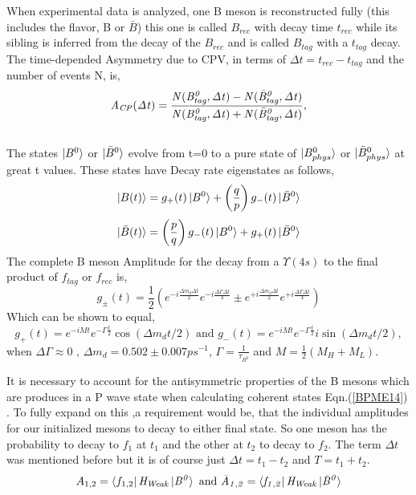 When experimental data is analyzed, one B meson is reconstructed fully (this includes the flavor, B or $\bar{B}$) this one is called $B_{rec}$ with decay time $t_{rec}$ while its sibling is inferred from the decay of the $B_{rec}$ and is called $B_{tag}$ with a $t_{tag}$ decay. The time-depended Asymmetry due to CPV, in terms of $\Delta{t} = t_{rec}-t_{tag}$ and the number of events N, is,
\begin{equation}\label{BPME6}
\it{A}_{CP}(\Delta t)= \frac{N(B^{0}_{tag},\Delta t)-N(\bar{B}^{0}_{tag},\Delta t)}{N(B^{0}_{tag},\Delta t)+N(\bar{B}^{0}_{tag},\Delta t)},
\end{equation}
\\

The states $\ket{B^{0}}$ or $\ket{\bar{B}^{0}}$ evolve from t=0 to a pure state of $\ket{B_{phys}^{0}}$ or $\ket{\bar{B}^{0}_{phys}}$ at great t values. 
These states have Decay rate eigenstates as follows,
\begin{equation}\label{BPME7}
\ket{B(t)}= g_+(t)\ket{B^0}+\left(\frac{q}{p}\right)g_{-}(t)\ket{\bar{B}^0}
\end{equation}
\begin{equation}\label{BPME8}
\ket{\bar{B}(t)}= \left(\frac{p}{q}\right)g_-(t)\ket{B^0}+g_{+}(t)\ket{\bar{B}^0}
\end{equation}
The complete B meson Amplitude for the decay from a $\Upsilon(4s)$ to the final product of $f_{tag}$ or $f_{rec}$ is,
\begin{equation}\label{BPME10}
 g_{\pm}(t)=\frac{1}{2}(e^{-i\frac{\Delta m_d \Delta t}{2}}e^{-i\frac{\Delta\Gamma \Delta t}{4}}\pm e^{+i\frac{\Delta m_d \Delta t}{2}}e^{+i\frac{\Delta\Gamma \Delta t}{4}})
\end{equation}
Which can be shown to equal,
\begin{equation}\label{BPME11}
g_{+}(t)=e^{-iMt}e^{-\Gamma\frac{t}{2}}\cos(\Delta m_d t/2) \mbox{   and   }g_{-}(t)=e^{-iMt}e^{-\Gamma\frac{t}{2}}i\sin(\Delta m_d t/2),
\end{equation}
when $\Delta\Gamma \approx 0 \mbox{ , }\Delta m_d = 0.502 \pm 0.007 ps^{-1}$, $\Gamma = \frac{1}{\tau_{B^0}}$ and $M=\frac{1}{2}(M_H+M_L)$.

It is necessary to account for the antisymmetric properties of the B mesons which are produces in a P wave state when calculating coherent states Eqn.(\ref{BPME14}) \cite{B10}. To fully expand on this ,a requirement would be, that the individual amplitudes for our initialized mesons to decay to either final state. So one meson has the probability to decay to $f_1$ at $t_1$ and the other at $t_2$ to decay to $f_2$. The term $\Delta t$ was mentioned before but it is of course just $\Delta t = t_1 -t_2$ and $T= t_1 +t_2$.
\begin{equation}\label{BPME12}
A_{1,2}=\bra{f_{1,2}}\it{H_{Weak}}\ket{B^{0}} \mbox{   and   } \bar{A}_{1,2}=\bra{f_{1,2}}\it{H_{Weak}}\ket{\bar{B}^{0}}
\end{equation}

